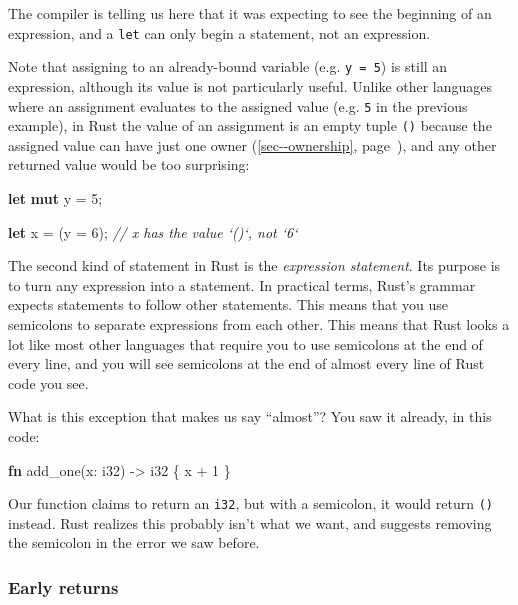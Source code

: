 \documentclass[a4paper,]{book}
\renewcommand*{\hyperref}[2][\ar]{%
  \def\ar{#2}%
  #2 (\autoref{#1}, page~\pageref{#1})}
\newenvironment{Shaded}{\begin{snugshade}}{\end{snugshade}}
\newcommand{\KeywordTok}[1]{\textcolor[rgb]{0.13,0.29,0.53}{\textbf{{#1}}}}
\newcommand{\DataTypeTok}[1]{\textcolor[rgb]{0.13,0.29,0.53}{{#1}}}
\newcommand{\DecValTok}[1]{\textcolor[rgb]{0.00,0.00,0.81}{{#1}}}
\newcommand{\CommentTok}[1]{\textcolor[rgb]{0.56,0.35,0.01}{\textit{{#1}}}}
\newcommand{\NormalTok}[1]{{#1}}
\begin{document}
The compiler is telling us here that it was expecting to see the
beginning of an expression, and a \texttt{let} can only begin a
statement, not an expression.

Note that assigning to an already-bound variable (e.g. \texttt{y\ =\ 5})
is still an expression, although its value is not particularly useful.
Unlike other languages where an assignment evaluates to the assigned
value (e.g. \texttt{5} in the previous example), in Rust the value of an
assignment is an empty tuple \texttt{()} because the assigned value can
have \hyperref[sec--ownership]{just one owner}, and any other returned
value would be too surprising:

\begin{Shaded}
\begin{Highlighting}[]
\KeywordTok{let} \KeywordTok{mut} \NormalTok{y = }\DecValTok{5}\NormalTok{;}

\KeywordTok{let} \NormalTok{x = (y = }\DecValTok{6}\NormalTok{);  }\CommentTok{// x has the value `()`, not `6`}
\end{Highlighting}
\end{Shaded}

The second kind of statement in Rust is the \emph{expression statement}.
Its purpose is to turn any expression into a statement. In practical
terms, Rust's grammar expects statements to follow other statements.
This means that you use semicolons to separate expressions from each
other. This means that Rust looks a lot like most other languages that
require you to use semicolons at the end of every line, and you will see
semicolons at the end of almost every line of Rust code you see.

What is this exception that makes us say ``almost''? You saw it already,
in this code:

\begin{Shaded}
\begin{Highlighting}[]
\KeywordTok{fn} \NormalTok{add_one(x: }\DataTypeTok{i32}\NormalTok{) -> }\DataTypeTok{i32} \NormalTok{\{}
    \NormalTok{x + }\DecValTok{1}
\NormalTok{\}}
\end{Highlighting}
\end{Shaded}

Our function claims to return an \texttt{i32}, but with a semicolon, it
would return \texttt{()} instead. Rust realizes this probably isn't what
we want, and suggests removing the semicolon in the error we saw before.

\subsubsection{Early returns}\label{early-returns-1}
\end{document}
